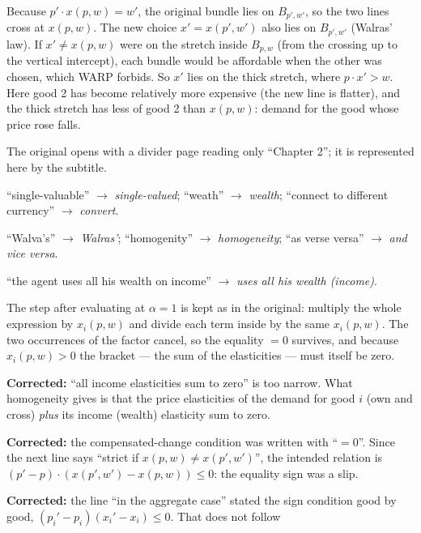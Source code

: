 \documentclass[11pt]{article}
\begin{document}
Because $p'\cdot x(p,w)=w'$, the original bundle lies on $B_{p',w'}$, so the two
lines cross at $x(p,w)$. The new choice $x'=x(p',w')$ also lies on $B_{p',w'}$
(Walras' law). If $x'\ne x(p,w)$ were on the stretch inside $B_{p,w}$ (from the
crossing up to the vertical intercept), each bundle would be affordable when the
other was chosen, which WARP forbids. So $x'$ lies on the thick stretch, where
$p\cdot x'>w$. Here good 2 has become relatively more expensive (the new line is
flatter), and the thick stretch has less of good 2 than $x(p,w)$: demand for the good
whose price rose falls.

\begin{transcriptnotes}
  \item The original opens with a divider page reading only ``Chapter 2''; it is
        represented here by the subtitle.
  \item ``single-valuable'' $\to$ \emph{single-valued}; ``weath'' $\to$
        \emph{wealth}; ``connect to different currency'' $\to$ \emph{convert}.
  \item ``Walva's'' $\to$ \emph{Walras'}; ``homogenity'' $\to$
        \emph{homogeneity}; ``as verse versa'' $\to$ \emph{and vice versa}.
  \item ``the agent uses all his wealth on income'' $\to$ \emph{uses all his wealth
        (income)}.
  \item The step after evaluating at $\alpha=1$ is kept as in the original: multiply
        the whole expression by $x_i(p,w)$ and divide each term inside by the same
        $x_i(p,w)$. The two occurrences of the factor cancel, so the equality $=0$
        survives, and because $x_i(p,w)>0$ the bracket --- the sum of the
        elasticities --- must itself be zero.
  \item \textbf{Corrected:} ``all income elasticities sum to zero'' is too narrow.
        What homogeneity gives is that the price elasticities of the demand for
        good $i$ (own and cross) \emph{plus} its income (wealth) elasticity sum to
        zero.
  \item \textbf{Corrected:} the compensated-change condition was written with
        ``$=0$''. Since the next line says ``strict if $x(p,w)\ne x(p',w')$'', the
        intended relation is $(p'-p)\cdot(x(p',w')-x(p,w))\le 0$: the equality sign
        was a slip.
  \item \textbf{Corrected:} the line ``in the aggregate case'' stated the sign
        condition good by good, $(p_i'-p_i)(x_i'-x_i)\le0$. That does not follow

\end{transcriptnotes}
\end{document}
